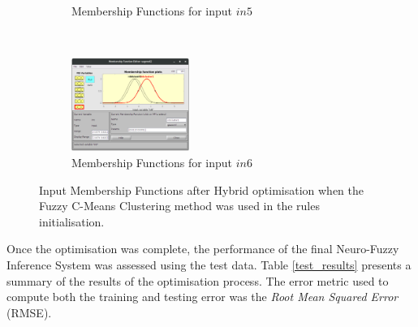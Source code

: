 \documentclass[11pt]{article}
\begin{document}
\begin{figure}[ht]
\begin{subfigure}[t]{0.3\textwidth}
		\caption{Membership Functions for input $in5$}
	\end{subfigure}
	~
	\begin{subfigure}[t]{0.3\textwidth}
		\centering
		\includegraphics[height=1.2in]{images/fcm_hybrid_in6}
		\caption{Membership Functions for input $in6$}
	\end{subfigure}
	\caption{Input Membership Functions after Hybrid optimisation when the Fuzzy C-Means Clustering method was used in the rules initialisation.}
\end{figure}

Once the optimisation was complete, the performance of the final Neuro-Fuzzy Inference System was assessed using the test data. Table \ref{test_results} presents a summary of the results of the optimisation process. The error metric used to compute both the training and testing error was the \emph{Root Mean Squared Error} (RMSE).
\end{document}
